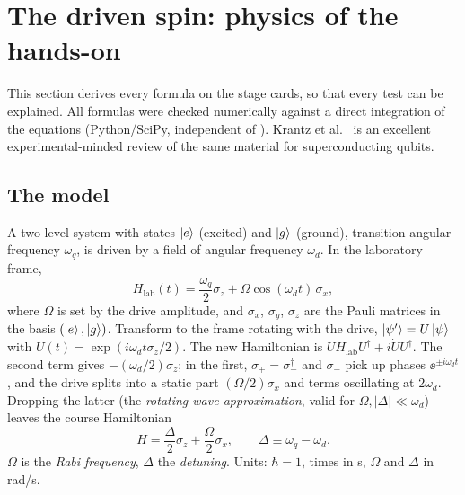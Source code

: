\section{The driven spin: physics of the hands-on}\label{sec:physics}


This section derives every formula on the stage cards, so that every test can be
explained. All formulas were checked numerically against a direct
integration of the equations (Python/SciPy, independent of ). Krantz
et al.\  is an excellent experimental-minded review of the same material for
superconducting qubits.

\subsection{The model}

A two-level system with states $\ket{e}$ (excited) and $\ket{g}$ (ground), transition
angular frequency $\omega_q$, is driven by a field of angular frequency $\omega_d$. In the
laboratory frame,
\begin{equation}
  H_{\mathrm{lab}}(t) = \frac{\omega_q}{2}\sigma_z + \Omega \cos(\omega_d t)\,\sigma_x ,
\end{equation}
where $\Omega$ is set by the drive amplitude, and $\sigma_x$, $\sigma_y$, $\sigma_z$ are the
Pauli matrices in the basis $(\ket{e}, \ket{g})$. Transform to the frame rotating with the
drive, $\ket{\psi'} = U\ket{\psi}$ with $U(t) = \exp(i\omega_d t \sigma_z/2)$. The new
Hamiltonian is $U H_{\mathrm{lab}} U^\dagger + i \dot U U^\dagger$. The second term gives
$-(\omega_d/2)\sigma_z$; in the first, $\sigma_+ = \sigma_-^\dagger$ and $\sigma_-$ pick up phases $\ee^{\pm i\omega_d t}$,
and the drive splits into a static part $(\Omega/2)\sigma_x$ and terms oscillating at
$2\omega_d$. Dropping the latter (the \emph{rotating-wave approximation}, valid for
$\Omega, |\Delta| \ll \omega_d$) leaves the course Hamiltonian
\begin{equation}\label{eq:H}
  H = \frac{\Delta}{2}\sigma_z + \frac{\Omega}{2}\sigma_x,
  \qquad \Delta \equiv \omega_q - \omega_d .
\end{equation}
$\Omega$ is the \emph{Rabi frequency}, $\Delta$ the \emph{detuning}. Units: $\hbar = 1$,
times in \textmu s, $\Omega$ and $\Delta$ in rad/\textmu s.

